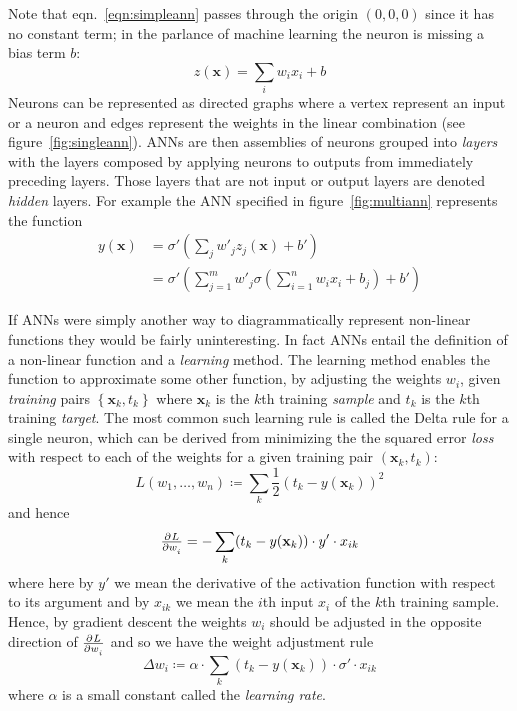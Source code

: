 %
Note that eqn.~\eqref{eqn:simpleann} passes through the origin \((0,0,0)\) since it has no constant term; in the parlance of machine learning the neuron is missing a bias term \(b\):
\begin{equation}
    z(\mathbf{x}) = \sum_i w_i x_i + b
    \label{eqn:linearregr}
\end{equation}
%
Neurons can be represented as directed graphs where a vertex represent an input or a neuron and edges represent the weights in the linear combination (see figure~\ref{fig:singleann}).
%
ANNs are then assemblies of neurons grouped into \textit{layers} with the layers composed by applying neurons to outputs from immediately preceding layers.
%
Those layers that are not input or output layers are denoted \textit{hidden} layers.
%
For example the ANN specified in figure~\ref{fig:multiann} represents the function
\begin{equation}
    \begin{split}
        y(\mathbf{x}) &= \sigma' \left( \sum_j w'_j z_j(\mathbf{x}) + b' \right) \\
        &=  \sigma' \left( \sum_{j=1}^m w'_j \sigma\left(\sum_{i=1}^n w_i x_i + b_j\right) + b' \right)
    \end{split}
\end{equation}

If ANNs were simply another way to diagrammatically represent non-linear functions they would be fairly uninteresting.
%
In fact ANNs entail the definition of a non-linear function and a \textit{learning} method.
%
The learning method enables the function to approximate some other function, by adjusting the weights \(w_i\), given \textit{training} pairs \(\left\{ \mathbf{x}_k, t_k \right\}\) where \(\mathbf{x}_k\) is the \(k\)th training \textit{sample} and \(t_k\) is the \(k\)th training \textit{target}.
%
The most common such learning rule is called the Delta rule\cite{widrow1960adaptive} for a single neuron, which can be derived from minimizing the the squared error \textit{loss} with respect to each of the weights for a given training pair \((\mathbf{x}_k, t_k)\):
\begin{equation}
    L(w_1, \dots, w_n) \coloneqq \sum_k \frac{1}{2} (t_k - y(\mathbf{x}_k))^2
    \label{eqn:loss}
\end{equation}
and hence
\begin{equation}
    \pd{L}{w_i} = - \sum_k(t_k-y(\mathbf{x}_k))\cdot y'\cdot x_{ik}
\end{equation}
where here by \(y'\) we mean the derivative of the activation function with respect to its argument and by \(x_{ik}\) we mean the \(i\)th input \(x_i\) of the \(k\)th training sample.
%
Hence, by gradient descent the weights \(w_i\) should be adjusted in the opposite direction of \(\pd{L}{w_i}\) and so we have the weight adjustment rule
\begin{equation}
    \Delta w_i \coloneqq \alpha \cdot \sum_k(t_k-y(\mathbf{x}_k))\cdot \sigma'\cdot x_{ik}
    \label{eqn:batchupdate}
\end{equation}
where \(\alpha\) is a small constant called the \textit{learning rate}.

